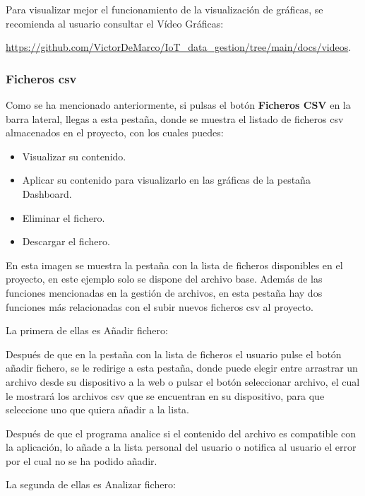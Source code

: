 Para visualizar mejor el funcionamiento de la visualización de gráficas, se recomienda al usuario consultar el Vídeo Gráficas:

\href{https://github.com/VictorDeMarco/IoT_data_gestion/tree/main/docs/videos}{https://github.com/VictorDeMarco/IoT\_data\_gestion/tree/main/docs/videos}.

\subsubsection{Ficheros csv}
Como se ha mencionado anteriormente, si pulsas el botón \textbf{Ficheros CSV}  en la barra lateral, llegas a esta pestaña, donde se muestra el listado de ficheros csv almacenados en el proyecto, con los cuales puedes:

\begin{itemize}
    \item Visualizar su contenido.
    \item Aplicar su contenido para visualizarlo en las gráficas de la pestaña Dashboard.
    \item Eliminar el fichero.
    \item Descargar el fichero.
\end{itemize}


En esta imagen se muestra la pestaña con la lista de ficheros disponibles en el proyecto, en este ejemplo solo se dispone del archivo base. Además de las funciones mencionadas en la gestión de archivos, en esta pestaña hay dos funciones más relacionadas con el subir nuevos ficheros csv al proyecto.

La primera de ellas es Añadir fichero:


Después de que en la pestaña con la lista de ficheros el usuario pulse el botón añadir fichero, se le redirige a esta pestaña, donde puede elegir entre arrastrar un archivo desde su dispositivo a la web o pulsar el botón seleccionar archivo, el cual le mostrará los archivos csv que se encuentran en su dispositivo, para que seleccione uno que quiera añadir a la lista.

Después de que el programa analice si el contenido del archivo es compatible con la aplicación, lo añade a la lista personal del usuario o notifica al usuario el error por el cual no se ha podido añadir.


La segunda de ellas es Analizar fichero:

